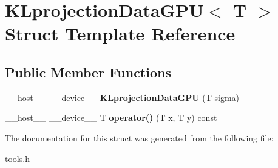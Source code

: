 \hypertarget{struct_k_lprojection_data_g_p_u}{}\section{K\+Lprojection\+Data\+G\+PU$<$ T $>$ Struct Template Reference}
\label{struct_k_lprojection_data_g_p_u}
\subsection*{Public Member Functions}
\begin{DoxyCompactItemize}
\item 
\mbox{\label{struct_k_lprojection_data_g_p_u_a02a9e5fe3f1d5b89b96f6260d097d574}} 
\+\_\+\+\_\+host\+\_\+\+\_\+ \+\_\+\+\_\+device\+\_\+\+\_\+ {\bfseries K\+Lprojection\+Data\+G\+PU} (T sigma)
\item 
\mbox{\label{struct_k_lprojection_data_g_p_u_a90a915874ea4bb44b84ccdd0a755c82e}} 
\+\_\+\+\_\+host\+\_\+\+\_\+ \+\_\+\+\_\+device\+\_\+\+\_\+ T {\bfseries operator()} (T x, T y) const
\end{DoxyCompactItemize}


The documentation for this struct was generated from the following file\+:\begin{DoxyCompactItemize}
\item 
\hyperlink{tools_8h}{tools.\+h}\end{DoxyCompactItemize}
